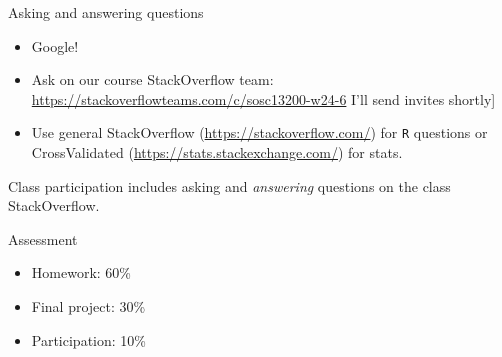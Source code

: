 \documentclass[xcolor={dvipsnames}, handout]{beamer}
\begin{document}
\begin{frame}{Asking and answering questions}

\begin{itemize}
\item Google! \pause
\item Ask on our course StackOverflow team: \url{https://stackoverflowteams.com/c/sosc13200-w24-6} \pause {[}I'll send invites shortly{]}  \pause
\item Use general StackOverflow (\url{https://stackoverflow.com/}) for \texttt{R} questions or CrossValidated (\url{https://stats.stackexchange.com/}) for stats. \pause
\end{itemize}

Class participation includes asking and \textit{answering} questions on the class StackOverflow.

\end{frame}




\begin{frame}{Assessment}

\begin{itemize}
\item Homework: 60\%
\item Final project: 30\%
\item Participation: 10\%
\end{itemize}

\end{frame}



\end{document}
